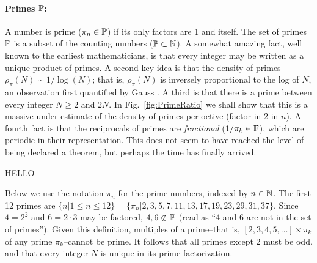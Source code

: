 \documentclass{ximera}
\begin{document}


\paragraph{Primes $\P$:}%

\label{page:bbP} %
A number is prime ($\pi_n \in\P$) if its only factors are 1 and itself. %
The set of primes $\P$ is a subset of the counting numbers ($\P \subset \N$). A somewhat amazing
fact, well known to the earliest mathematicians, is that every integer may be written as a unique
product of primes. A second key idea is that the density of primes $\rho_\pi(N) \sim 1/\log(N)$; that is, $\rho_\pi(N)$ is inversely proportional to the log of $N$,
an observation first quantified by Gauss \citep{Goldstein73}.
A third is that there is a prime between every integer $N\ge2$ and $2N$.  %
 
 \red
In Fig.~\ref{fig:PrimeRatio} we shall show that this is a massive under estimate of the density of primes per octive (factor in 2 in $n$).
%
A fourth fact is that the reciprocals of primes are \emph{fractional} ($1/\pi_k\in \F$), which are periodic in their representation.%
 \black
This does not seem to have reached the level of being declared a theorem, but perhaps the time has finally arrived.

HELLO


Below we use the notation $\pi_n$ for the prime numbers, indexed by $n\in\N$. 
The first 12 primes are $\{n | 1 \le n \le 12\} = \{\pi_n | 2, 3, 5, 7, 11, 13, 17, 19, 23, 29, 31, 37 \}$.
Since $4=2^2$ and $6=2 \cdot 3$ may be factored,  $4, 6 \not\in \, \P$ (read as ``4 and 6
are not in the set of primes'').  Given this definition, multiples of a prime--that is, $[2, 3, 4, 5, \ldots] \times \pi_k$ of any prime $\pi_k$--cannot be prime.
It follows that all primes except 2 must be odd, and that every integer $N$ is unique in its prime factorization.
\end{document}
